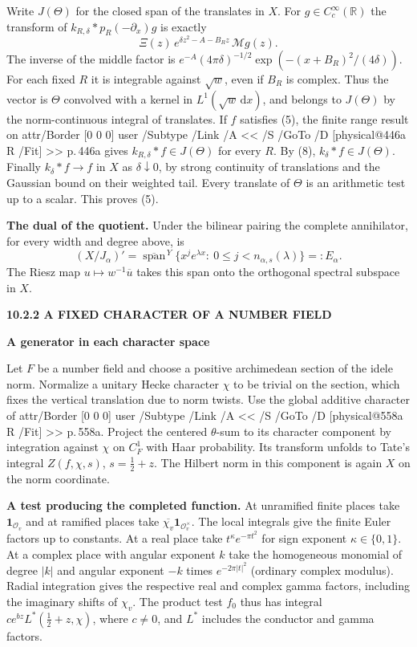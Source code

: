 \documentclass[11pt,letterpaper]{article}
\makeatletter
\newcommand{\rightmarktext}{}
\newcommand{\printfolio}{}
\newcommand{\leaf}[4]{\clearpage\gdef\printfolio{#1}\gdef\rightmarktext{#2}%
  {\small\sffamily\bfseries\color{ink}#3\par}\vspace{3pt}%
  {\LARGE\bfseries #4\par}\vspace{5pt}}
\newcommand{\point}[1]{\par\smallskip\textbf{#1.}\enspace\ignorespaces}
\newcommand{\R}{\mathbb R}
\newcommand{\dd}{\,\mathrm d}
\DeclareMathOperator{\Span}{span}
\newcommand{\MusicPDFPageRef}[1]{\pdfpageref\csname physical@#1\endcsname\space\space 0 R}
\newcommand{\pagelink}[2]{\leavevmode\pdfstartlink attr{/Border [0 0 0]} user{%
  /Subtype /Link /A << /S /GoTo /D [\MusicPDFPageRef{#1} /Fit] >>}%
  {\color{ink}#2}\pdfendlink}
\newcommand{\pg}[1]{\pagelink{#1}{p.\,#1}}
\makeatother
\begin{document}
Write $J(\Theta)$ for the closed span of the translates in $X$. For
$g\in C_c^\infty(\R)$ the transform of
$k_{R,\delta}*p_R(-\partial_x)g$ is exactly
\[
      \Xi(z)\, e^{\delta z^2-A-B_Rz}\,\mathcal M g(z).
\]
The inverse of the middle factor is
$e^{-A}(4\pi\delta)^{-1/2}\exp(-(x+B_R)^2/(4\delta))$.
For each fixed $R$ it is integrable against $\sqrt w$, even if $B_R$
is complex. Thus the vector is $\Theta$ convolved with a kernel in
$L^1(\sqrt w\dd x)$, and belongs to $J(\Theta)$ by the norm-continuous
integral of translates. If $f$ satisfies (5), the finite range result
on \pg{446a} gives $k_{R,\delta}*f\in J(\Theta)$ for every $R$.
By (8), $k_\delta*f\in J(\Theta)$. Finally $k_\delta*f\to f$ in
$X$ as $\delta\downarrow0$, by strong continuity of translations and
the Gaussian bound on their weighted tail. Every translate of $\Theta$
is an arithmetic test up to a scalar. This proves (5).

\point{The dual of the quotient} Under the bilinear pairing the complete
annihilator, for every width and degree above, is
\[
 (X/J_\alpha)'=\overline{\Span}^{\,Y}
   \{x^je^{\lambda x}:\ 0\le j<n_{\alpha,s}(\lambda)\}=:E_\alpha .
 \tag{9}
\]
The Riesz map $u\mapsto w^{-1}\overline u$ takes this span onto the
orthogonal spectral subspace in $X$.

\leaf{446c}{Hecke characters}{10.2.2 \quad A FIXED CHARACTER OF A NUMBER FIELD}{A generator in each character space}
Let $F$ be a number field and choose a positive archimedean section of the
idele norm. Normalize a unitary Hecke character $\chi$ to be trivial on the
section, which fixes the vertical translation due to norm twists. Use the
global additive character of \pg{558a}. Project the centered
$\theta$-sum to its character component by integration against $\chi$ on
$C_F^1$ with Haar probability. Its transform unfolds to Tate's integral
$Z(f,\chi,s)$, $s=\tfrac12+z$. The Hilbert norm in this component is again
$X$ on the norm coordinate.

\point{A test producing the completed function} At unramified finite places
take $\mathbf1_{\mathcal O_v}$ and at ramified places take
$\overline{\chi_v}\mathbf1_{\mathcal O_v^\times}$. The local integrals give
the finite Euler factors up to constants. At a real place take
$t^\kappa e^{-\pi t^2}$ for sign exponent $\kappa\in\{0,1\}$. At a complex
place with angular exponent $k$ take the homogeneous monomial of degree
$|k|$ and angular exponent $-k$ times $e^{-2\pi|t|^2}$ (ordinary complex
modulus). Radial integration gives the respective real and complex gamma
factors, including the imaginary shifts of $\chi_v$. The product test
$f_0$ thus has integral $c e^{bz}L^*(\tfrac12+z,\chi)$, where $c\ne0$,
and $L^*$ includes the conductor and gamma factors.
\end{document}
